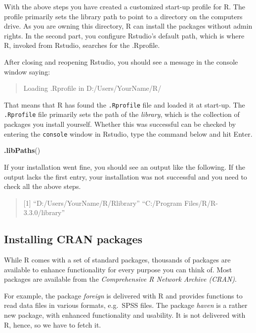 \documentclass[]{svmono}
\newenvironment{Shaded}{\begin{snugshade}}{\end{snugshade}}
\newcommand{\KeywordTok}[1]{\textcolor[rgb]{0.13,0.29,0.53}{\textbf{#1}}}
\newcommand{\NormalTok}[1]{#1}
\theoremstyle{definition}
\theoremstyle{definition}
\theoremstyle{definition}
\theoremstyle{remark}
\begin{document}
With the above steps you have created a customized start-up profile for
R. The profile primarily sets the library path to point to a directory
on the computers drive. As you are owning this directory, R can install
the packages without admin rights. In the second part, you configure
Rstudio's default path, which is where R, invoked from Rstudio, searches
for the .Rprofile.

After closing and reopening Rstudio, you should see a message in the
console window saying:

\begin{quote}
Loading .Rprofile in D:/Users/YourName/R/
\end{quote}

That means that R has found the \texttt{.Rprofile} file and loaded it at
start-up. The \texttt{.Rprofile} file primarily sets the path of the
\emph{library}, which is the collection of packages you install
yourself. Whether this was successful can be checked by entering the
\texttt{console} window in Rstudio, type the command below and hit
Enter.

\begin{Shaded}
\begin{Highlighting}[]
\KeywordTok{.libPaths}\NormalTok{()}
\end{Highlighting}
\end{Shaded}

If your installation went fine, you should see an output like the
following. If the output lacks the first entry, your installation was
not successful and you need to check all the above steps.

\begin{quote}
{[}1{]} ``D:/Users/YourName/R/Rlibrary'' ``C:/Program
Files/R/R-3.3.0/library''
\end{quote}

\subsection{Installing CRAN packages}\label{installing-cran-packages}

While R comes with a set of standard packages, thousands of packages are
available to enhance functionality for every purpose you can think of.
Most packages are available from the \emph{Comprehensive R Network
Archive (CRAN)}.

For example, the package \emph{foreign} is delivered with R and provides
functions to read data files in various formats, e.g.~SPSS files. The
package \emph{haven} is a rather new package, with enhanced
functionality and usability. It is not delivered with R, hence, so we
have to fetch it.
\end{document}
